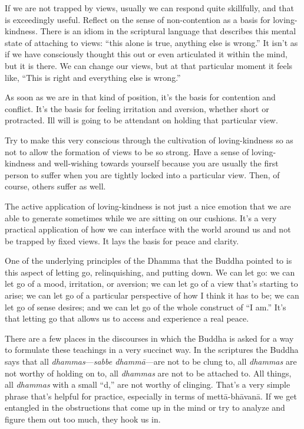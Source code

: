 If we are not trapped by views, usually we can respond quite skillfully,
and that is exceedingly useful. Reflect on the sense of non-contention
as a basis for loving-kindness. There is an idiom in the scriptural
language that describes this mental state of attaching to views: “this
alone is true, anything else is wrong.” It isn’t as if we have
consciously thought this out or even articulated it within the mind, but
it is there. We can change our views, but at that particular moment it
feels like, “This is right and everything else is wrong.”

As soon as we are in that kind of position, it’s the basis for
contention and conflict. It’s the basis for feeling irritation and
aversion, whether short or protracted. Ill will is going to be attendant
on holding that particular view.

Try to make this very conscious through the cultivation of
loving-kindness so as not to allow the formation of views to be so
strong. Have a sense of loving-kindness and well-wishing towards
yourself because you are usually the first person to suffer when you are
tightly locked into a particular view. Then, of course, others suffer as
well.

The active application of loving-kindness is not just a nice emotion
that we are able to generate sometimes while we are sitting on our
cushions. It’s a very practical application of how we can interface with
the world around us and not be trapped by fixed views. It lays the basis
for peace and clarity.

One of the underlying principles of the Dhamma that the Buddha pointed
to is this aspect of letting go, relinquishing, and putting down. We can
let go: we can let go of a mood, irritation, or aversion; we can let go
of a view that’s starting to arise; we can let go of a particular
perspective of how I think it has to be; we can let go of sense desires;
and we can let go of the whole construct of “I am.” It’s that letting go
that allows us to access and experience a real peace.

There are a few places in the discourses in which the Buddha is asked
for a way to formulate these teachings in a very succinct way. In the
scriptures the Buddha says that all \emph{dhammas}—\emph{sabbe
dhammā}—are not to be clung to, all \emph{dhammas} are not worthy of
holding on to, all \emph{dhammas} are not to be attached to. All things,
all \emph{dhammas} with a small “d,” are not worthy of clinging. That’s
a very simple phrase that’s helpful for practice, especially in terms of
mettā-bhāvanā. If we get entangled in the obstructions that come up in
the mind or try to analyze and figure them out too much, they hook us
in.

